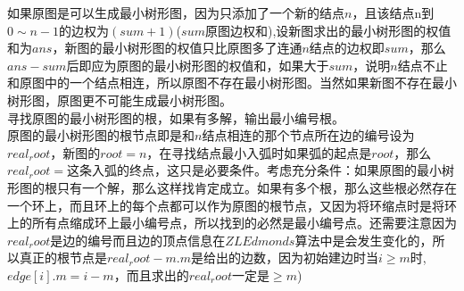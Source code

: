 如果原图是可以生成最小树形图，因为只添加了一个新的结点$n$，且该结点n到$0\sim n-1$的边权为$(sum + 1)$($sum$原图边权和),设新图求出的最小树形图的权值和为$ans$，新图的最小树形图的权值只比原图多了连通$n$结点的边权即$sum$，那么$ans - sum$后即应为原图的最小树形图的权值和，如果大于$sum$，说明$n$结点不止和原图中的一个结点相连，所以原图不存在最小树形图。当然如果新图不存在最小树形图，原图更不可能生成最小树形图。 \\
寻找原图的最小树形图的根，如果有多解，输出最小编号根。\\
原图的最小树形图的根节点即是和$n$结点相连的那个节点所在边的编号设为$real_root$，新图的$root = n$，在寻找结点最小入弧时如果弧的起点是$root$，那么$real_root = $这条入弧的终点，这只是必要条件。考虑充分条件：如果原图的最小树形图的根只有一个解，那么这样找肯定成立。如果有多个根，那么这些根必然存在一个环上，而且环上的每个点都可以作为原图的根节点，又因为将环缩点时是将环上的所有点缩成环上最小编号点，所以找到的必然是最小编号点。还需要注意因为$real_root$是边的编号而且边的顶点信息在$ZLEdmonds$算法中是会发生变化的，所以真正的根节点是$real_root - m$.$m$是给出的边数，因为初始建边时当$i \geq m$时,$edge[i].m = i - m$，而且求出的$real_root$一定是$\geq m$)
